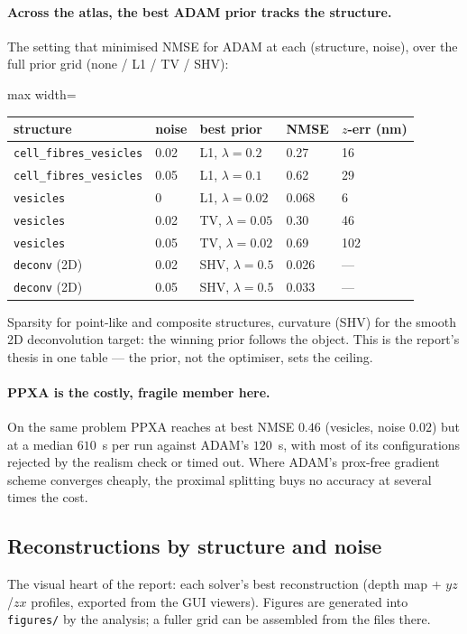 \paragraph{Across the atlas, the best ADAM prior tracks the structure.}
The setting that minimised NMSE for ADAM at each (structure, noise), over the full prior grid
(none / L1 / TV / SHV):
\begin{center}\begin{adjustbox}{max width=\linewidth}
\begin{tabular}{lllll}
\toprule
structure & noise & best prior & NMSE & $z$-err (nm) \\
\midrule
\texttt{cell\_fibres\_vesicles} & 0.02 & L1, $\lambda=0.2$ & 0.27 & 16 \\
\texttt{cell\_fibres\_vesicles} & 0.05 & L1, $\lambda=0.1$ & 0.62 & 29 \\
\texttt{vesicles} & 0 & L1, $\lambda=0.02$ & 0.068 & 6 \\
\texttt{vesicles} & 0.02 & TV, $\lambda=0.05$ & 0.30 & 46 \\
\texttt{vesicles} & 0.05 & TV, $\lambda=0.02$ & 0.69 & 102 \\
\texttt{deconv} (2D) & 0.02 & SHV, $\lambda=0.5$ & 0.026 & --- \\
\texttt{deconv} (2D) & 0.05 & SHV, $\lambda=0.5$ & 0.033 & --- \\
\bottomrule
\end{tabular}\end{adjustbox}\end{center}

\noindent Sparsity for point-like and composite structures, curvature (SHV) for the smooth 2D
deconvolution target: the winning prior follows the object. This is the report's thesis in one
table --- the prior, not the optimiser, sets the ceiling.

\paragraph{PPXA is the costly, fragile member here.} On the same problem PPXA reaches at best
NMSE $0.46$ (vesicles, noise $0.02$) but at a median $610$~s per run against ADAM's $120$~s, with
most of its configurations rejected by the realism check or timed out. Where ADAM's prox-free
gradient scheme converges cheaply, the proximal splitting buys no accuracy at several times the
cost.

\subsection{Reconstructions by structure and noise}
The visual heart of the report: each solver's best reconstruction (depth map + $yz$/$zx$
profiles, exported from the GUI viewers). Figures are generated into \texttt{figures/} by the
analysis; a fuller grid can be assembled from the files there.

